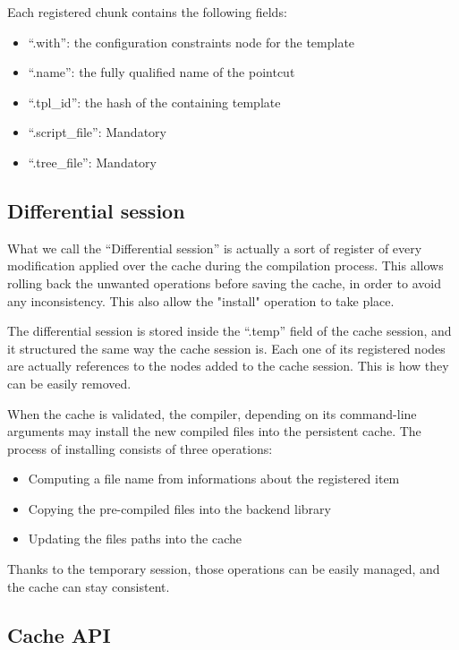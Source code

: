 \documentclass[american]{rtxreport}
\begin{document}
\begin{enumerate}
Each registered chunk contains the following fields:
\begin{itemize}
    \item ``.with'': the configuration constraints node for the template
    \item ``.name'': the fully qualified name of the pointcut
    \item ``.tpl\_id'': the hash of the containing template
    \item ``.script\_file'': Mandatory
    \item ``.tree\_file'': Mandatory
\end{itemize}


\subsection{Differential session}

What we call the ``Differential session'' is actually a sort of register of
every modification applied over the cache during the compilation process. This
allows rolling back the unwanted operations before saving the cache, in order
to avoid any inconsistency. This also allow the "install" operation to take
place.

The differential session is stored inside the ``.temp'' field of the cache
session, and it structured the same way the cache session is. Each one of its
registered nodes are actually references to the nodes added to the cache
session. This is how they can be easily removed.

When the cache is validated, the compiler, depending on its command-line
arguments may install the new compiled files into the persistent cache. The
process of installing consists of three operations:
\begin{itemize}
    \item Computing a file name from informations about the registered item
    \item Copying the pre-compiled files into the backend library
    \item Updating the files paths into the cache
\end{itemize}

Thanks to the temporary session, those operations can be easily managed, and
the cache can stay consistent.


\subsection{Cache API}


\end{enumerate}
\end{document}

